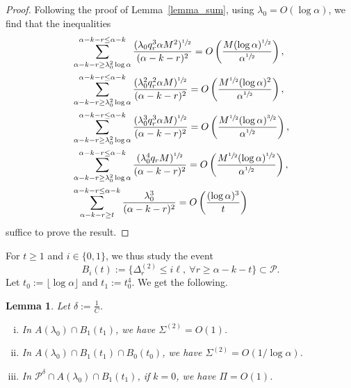 \documentclass{article}
\theoremstyle{plain}
\theoremstyle{remark}
\theoremstyle{plain}
\newtheorem{lemma}[theorem]{Lemma}
\numberwithin{equation}{section}
\begin{document}
	\begin{proof}
		Following the proof of Lemma~\ref{lemma_sum}, using $\lambda_0=O(\log\alpha)$, we find that the inequalities
		\begin{align}
			&\sum_{\alpha-k-r\geq\lambda_0^2\log\alpha}^{\alpha-k-r\leq\alpha-k}\frac{(\lambda_0q_r^3\alpha M^2)^{\sfrac12}}{(\alpha-k-r)^2}=O\left(\frac{M(\log\alpha)^{\sfrac12}}{\alpha^{\sfrac12}}\right),
			\\&\sum_{\alpha-k-r\geq\lambda_0^2\log\alpha}^{\alpha-k-r\leq\alpha-k}\frac{(\lambda_0^2q_r^2\alpha M)^{\sfrac12}}{(\alpha-k-r)^2}=O\left(\frac{M^{\sfrac12}(\log\alpha)^2}{\alpha^{\sfrac12}}\right),
			\\&\sum_{\alpha-k-r\geq\lambda_0^2\log\alpha}^{\alpha-k-r\leq\alpha-k}\frac{(\lambda_0^3q_r^3\alpha M)^{\sfrac12}}{(\alpha-k-r)^2}=O\left(\frac{M^{\sfrac12}(\log\alpha)^{\sfrac32}}{\alpha^{\sfrac12}}\right),
			\\&\sum_{\alpha-k-r\geq\lambda_0^2\log\alpha}^{\alpha-k-r\leq\alpha-k}\frac{(\lambda_0^4q_rM)^{\sfrac12}}{(\alpha-k-r)^2}=O\left(\frac{M^{\sfrac12}(\log\alpha)^{\sfrac12}}{\alpha^{\sfrac12}}\right),
			\\&\sum_{\alpha-k-r\geq t}^{\alpha-k-r\leq\alpha-k}\frac{\lambda_0^3}{(\alpha-k-r)^2}=O\left(\frac{(\log\alpha)^3}t\right)
		\end{align}
		suffice to prove the result.
	\end{proof}
	
	For $t\geq1$ and $i\in\{0,1\}$, we thus study the event $$B_i(t):=\{\Delta_r^{(2)}\leq i\ell,\ \forall r\geq\alpha-k-t\}\subset\mathcal{P}.$$ Let $t_0:=\lfloor\log\alpha\rfloor$ and $t_1:=t_0^4$. We get the following.
	
	\begin{lemma}\label{lemma_sumab}
		Let $\delta:=\tfrac1{C}$.
		\begin{enumerate}[(i)]
			\item\label{lemma_sumab_ab1} In $A(\lambda_0)\cap B_1(t_1)$, we have $\Sigma^{(2)}=O(1)$.
			\item\label{lemma_sumab_ab0} In $A(\lambda_0)\cap B_1(t_1)\cap B_0(t_0)$, we have $\Sigma^{(2)}=O(1/\log\alpha)$.
			\item\label{lemma_sumab_pi} In $\mathcal{P}^{\delta}\cap A(\lambda_0)\cap B_1(t_1)$, if $k=0$, we have $\Pi=O(1)$.
		\end{enumerate}
	\end{lemma}
	
\end{document}
